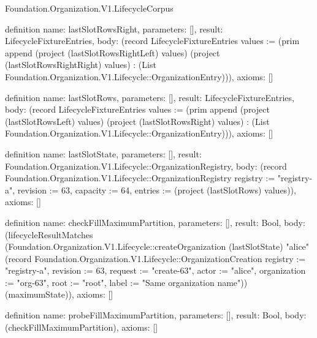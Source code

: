 \begin{lexlean}{Foundation.Organization.V1.LifecycleCorpus}
\begin{semanticmodule}
definition{
  name: lastSlotRowsRight,
  parameters: [],
  result: LifecycleFixtureEntries,
  body: (record LifecycleFixtureEntries {values := (prim append (project (lastSlotRowsRightLeft) values) (project (lastSlotRowsRightRight) values) : (List Foundation.Organization.V1.Lifecycle::OrganizationEntry))}),
  axioms: []
}

definition{
  name: lastSlotRows,
  parameters: [],
  result: LifecycleFixtureEntries,
  body: (record LifecycleFixtureEntries {values := (prim append (project (lastSlotRowsLeft) values) (project (lastSlotRowsRight) values) : (List Foundation.Organization.V1.Lifecycle::OrganizationEntry))}),
  axioms: []
}

definition{
  name: lastSlotState,
  parameters: [],
  result: Foundation.Organization.V1.Lifecycle::OrganizationRegistry,
  body: (record Foundation.Organization.V1.Lifecycle::OrganizationRegistry {registry := "registry-a", revision := 63, capacity := 64, entries := (project (lastSlotRows) values)}),
  axioms: []
}

definition{
  name: checkFillMaximumPartition,
  parameters: [],
  result: Bool,
  body: (lifecycleResultMatches (Foundation.Organization.V1.Lifecycle::createOrganization (lastSlotState) "alice" (record Foundation.Organization.V1.Lifecycle::OrganizationCreation {registry := "registry-a", revision := 63, request := "create-63", actor := "alice", organization := "org-63", root := "root", label := "Same organization name"})) (maximumState)),
  axioms: []
}

definition{
  name: probeFillMaximumPartition,
  parameters: [],
  result: Bool,
  body: (checkFillMaximumPartition),
  axioms: []
}


\end{semanticmodule}
\end{lexlean}
